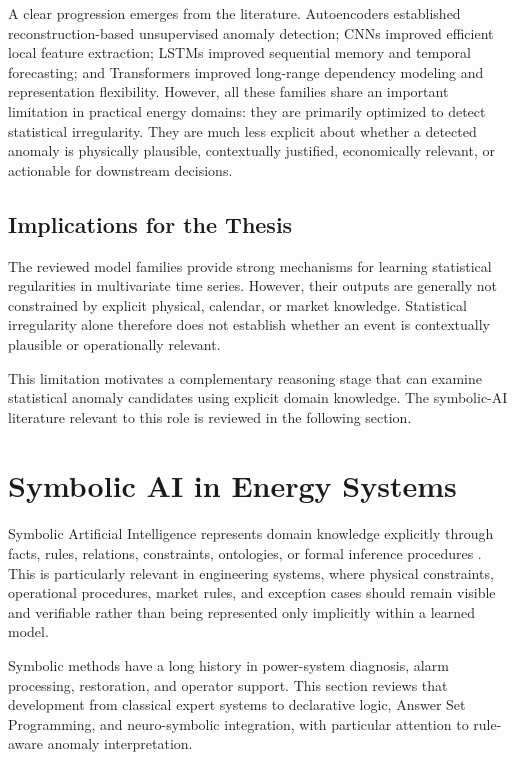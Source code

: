 A clear progression emerges from the literature. Autoencoders established reconstruction-based unsupervised anomaly detection; CNNs improved efficient local feature extraction; LSTMs improved sequential memory and temporal forecasting; and Transformers improved long-range dependency modeling and representation flexibility. However, all these families share an important limitation in practical energy domains: they are primarily optimized to detect statistical irregularity. They are much less explicit about whether a detected anomaly is physically plausible, contextually justified, economically relevant, or actionable for downstream decisions.

\subsection{Implications for the Thesis}

The reviewed model families provide strong mechanisms for learning statistical
regularities in multivariate time series. However, their outputs are generally not
constrained by explicit physical, calendar, or market knowledge. Statistical
irregularity alone therefore does not establish whether an event is contextually
plausible or operationally relevant.

This limitation motivates a complementary reasoning stage that can examine
statistical anomaly candidates using explicit domain knowledge. The symbolic-AI
literature relevant to this role is reviewed in the following section.

\section{Symbolic AI in Energy Systems}
\label{sec:symbolic_ai_energy_systems}

Symbolic Artificial Intelligence represents domain knowledge explicitly through
facts, rules, relations, constraints, ontologies, or formal inference procedures
\cite{russell2021ai,buchanan1984rulebased,baral2003knowledge,sowa2000knowledge}.
This is particularly relevant in engineering systems, where physical constraints,
operational procedures, market rules, and exception cases should remain visible
and verifiable rather than being represented only implicitly within a learned
model.

Symbolic methods have a long history in power-system diagnosis, alarm processing,
restoration, and operator support. This section reviews that development from
classical expert systems to declarative logic, Answer Set Programming, and
neuro-symbolic integration, with particular attention to rule-aware anomaly
interpretation.



